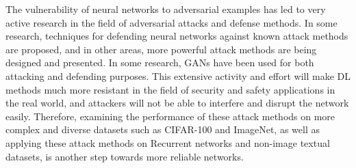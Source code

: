 \documentclass[lettersize,journal]{IEEEtran}
\begin{document}
The vulnerability of neural networks to adversarial examples has led to very active research in the field of adversarial attacks and defense methods. In some research, techniques for defending neural networks against known attack methods are proposed, and in other areas, more powerful attack methods are being designed and presented. In some research, GANs have been used for both attacking and defending purposes. This extensive activity and effort will make DL methods much more resistant in the field of security and safety applications in the real world, and attackers will not be able to interfere and disrupt the network easily. Therefore, examining the performance of these attack methods on more complex and diverse datasets such as CIFAR-100 and ImageNet, as well as applying these attack methods on Recurrent networks and non-image textual datasets, is another step towards more reliable networks.



\end{document}
